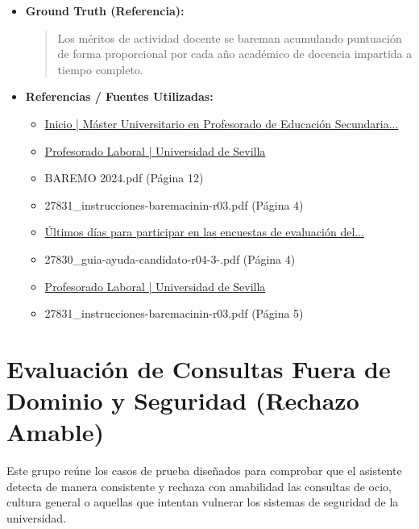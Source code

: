 \documentclass[12pt,a4paper,oneside]{report}
\begin{document}
\begin{itemize}
\begin{itemize}
\begin{quote}
Es importante consultar los documentos de referencia y seguir las instrucciones dadas para cada mérito en la Guía de Ayuda al Candidato para asegurarse de que los méritos sean baremados correctamente.
                \end{quote}
          \item \textbf{{Ground Truth (Referencia):}} \\
                \begin{quote}
Los méritos de actividad docente se bareman acumulando puntuación de forma proporcional por cada año académico de docencia impartida a tiempo completo.
                \end{quote}
          \item \textbf{{Referencias / Fuentes Utilizadas:}} \\
                \begin{itemize}
                  \item \href{https://masteroficial.us.es/maes/index.php?p=form&id=3}{Inicio | Máster Universitario en Profesorado de Educación Secundaria...}
                  \item \href{https://edwww.us.es/trabaja-en-la-us/profesorado/planificacion-y-seleccion/profesorado-laboral}{Profesorado Laboral | Universidad de Sevilla}
                  \item BAREMO 2024.pdf (Página 12)
                  \item 27831\_instrucciones-baremacinin-r03.pdf (Página 4)
                  \item \href{https://www.us.es/actualidad-de-la-us/ultimos-dias-para-participar-en-las-encuestas-de-evaluacion-del-profesorado}{Últimos días para participar en las encuestas de evaluación del...}
                  \item 27830\_guia-ayuda-candidato-r04-3-.pdf (Página 4)
                  \item \href{https://www.us.es/trabaja-en-la-us/profesorado/planificacion-y-seleccion/profesorado-laboral}{Profesorado Laboral | Universidad de Sevilla}
                  \item 27831\_instrucciones-baremacinin-r03.pdf (Página 5)
                \end{itemize}
        \end{itemize}

  
\end{itemize}

\section{Evaluación de Consultas Fuera de Dominio y Seguridad (Rechazo Amable)}
Este grupo reúne los casos de prueba diseñados para comprobar que el asistente detecta de manera consistente y rechaza con amabilidad las consultas de ocio, cultura general o aquellas que intentan vulnerar los sistemas de seguridad de la universidad.
\end{document}
